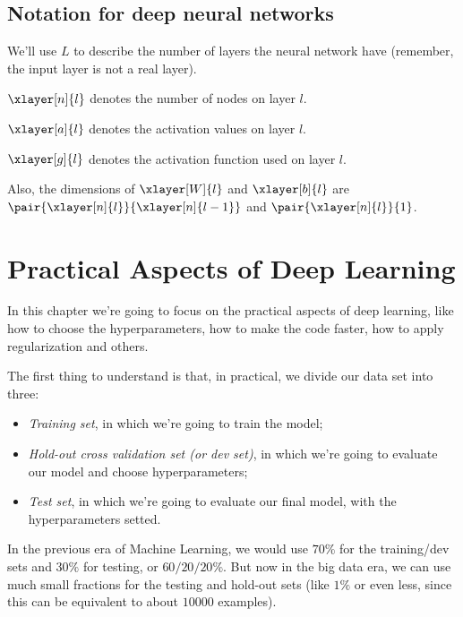 \documentclass[12pt, a4paper, oneside]{book}
\begin{document}
\section{Notation for deep neural networks}%
\label{sec:notation_for_deep_neural_networks}

We'll use $L$ to describe the number of layers the neural network have
(remember, the input layer is not a real layer).

$\xlayer[n]{l}$ denotes the number of nodes on layer $l$.

$\xlayer[a]{l}$ denotes the activation values on layer $l$.

$\xlayer[g]{l}$ denotes the activation function used on layer $l$.

Also, the dimensions of $\xlayer[W]{l}$ and $\xlayer[b]{l}$ are
$\pair{\xlayer[n]{l}}{\xlayer[n]{l-1}}$ and $\pair{\xlayer[n]{l}}{1}$.


\chapter{Practical Aspects of Deep Learning}%
\label{cha:practical_aspects_of_deep_learning}

In this chapter we're going to focus on the practical aspects of deep learning,
like how to choose the hyperparameters, how to make the code faster, how to
apply regularization and others.

The first thing to understand is that, in practical, we divide our data set
into three:
\begin{itemize}
    \item \textit{Training set}, in which we're going to train the model;
    \item \textit{Hold-out cross validation set (or dev set)}, in which we're
        going to evaluate our model and choose hyperparameters;
    \item \textit{Test set}, in which we're going to evaluate our final model,
        with the hyperparameters setted.
\end{itemize}

In the previous era of Machine Learning, we would use $70\%$ for the
training/dev sets and $30\%$ for testing, or $60/20/20\%$. But now in the big
data era, we can use much small fractions for the testing and hold-out sets
(like $1\%$ or even less, since this can be equivalent to about $10000$
examples).
\end{document}
